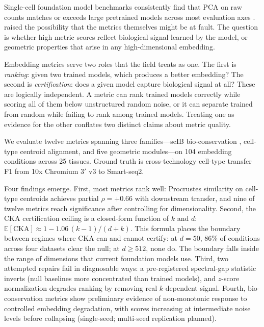 \documentclass[11pt]{article}
\begin{document}
Single-cell foundation model benchmarks consistently find that PCA on
raw counts matches or exceeds large pretrained models across most
evaluation axes \citep{wu2025scfm, vcbench2026, unifiedscfm2026,
cellxgeneintegration2026}. \citet{wu2025scfm} raised the possibility
that the metrics themselves might be at fault. The question is whether
high metric scores reflect biological signal learned by the model, or
geometric properties that arise in any high-dimensional embedding.

Embedding metrics serve two roles that the field treats as one. The
first is \emph{ranking}: given two trained models, which produces a
better embedding? The second is \emph{certification}: does a given
model capture biological signal at all? These are logically independent.
A metric can rank trained models correctly while scoring all of them
below unstructured random noise, or it can separate trained from random
while failing to rank among trained models. Treating one as evidence for
the other conflates two distinct claims about metric quality.

We evaluate twelve metrics spanning three families---scIB
bio-conservation \citep{luecken2022scib}, cell-type centroid alignment,
and five geometric modules---on 104 embedding conditions across 25
tissues. Ground truth is cross-technology cell-type transfer F1 from
10x Chromium 3$'$ v3 to Smart-seq2.

Four findings emerge. First, most metrics rank well: Procrustes
similarity on cell-type centroids achieves partial $\rho = +0.66$ with
downstream transfer, and nine of twelve metrics reach significance after
controlling for dimensionality. Second, the CKA certification ceiling is
a closed-form function of $k$ and $d$:
$\mathbb{E}[\mathrm{CKA}] \approx 1 - 1.06\,(k{-}1)/(d{+}k)$. This
formula places the boundary between regimes where CKA can and cannot
certify: at $d = 50$, 86\% of conditions across four datasets clear the
null; at $d \geq 512$, none do. The boundary falls inside the range of
dimensions that current foundation models use. Third, two attempted
repairs fail in diagnosable ways: a pre-registered spectral-gap
statistic inverts (null baselines more concentrated than trained
models), and $z$-score normalization degrades ranking by removing real
$k$-dependent signal. Fourth, bio-conservation metrics show preliminary
evidence of non-monotonic response to controlled embedding degradation,
with scores increasing at intermediate noise levels before collapsing
(single-seed; multi-seed replication planned).
\end{document}
